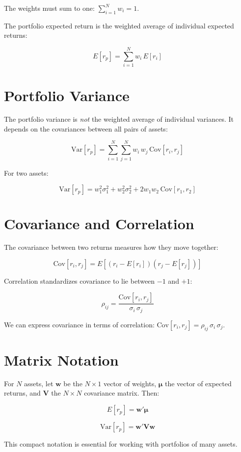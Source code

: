 \documentclass[11pt,letterpaper]{report}
\begin{document}
The weights must sum to one: $\sum_{i=1}^{N} w_i = 1$.

The portfolio expected return is the weighted average of individual expected returns:

$$E[r_p] = \sum_{i=1}^{N} w_i \, E[r_i]$$

\section{Portfolio Variance}


The portfolio variance is \textit{not} the weighted average of individual variances.  It depends on the covariances between all pairs of assets:

$$\text{Var}[r_p] = \sum_{i=1}^{N}\sum_{j=1}^{N} w_i \, w_j \, \text{Cov}[r_i, r_j]$$

For two assets:

$$\text{Var}[r_p] = w_1^2 \sigma_1^2 + w_2^2 \sigma_2^2 + 2 w_1 w_2 \, \text{Cov}[r_1, r_2]$$

\section{Covariance and Correlation}


The covariance between two returns measures how they move together:

$$\text{Cov}[r_i, r_j] = E\left[(r_i - E[r_i])(r_j - E[r_j])\right]$$

Correlation standardizes covariance to lie between $-1$ and $+1$:

$$\rho_{ij} = \frac{\text{Cov}[r_i, r_j]}{\sigma_i \, \sigma_j}$$

We can express covariance in terms of correlation: $\text{Cov}[r_i, r_j] = \rho_{ij} \, \sigma_i \, \sigma_j$.

\section{Matrix Notation}


For $N$ assets, let $\mathbf{w}$ be the $N \times 1$ vector of weights, $\boldsymbol{\mu}$ the vector of expected returns, and $\mathbf{V}$ the $N \times N$ covariance matrix.  Then:

$$E[r_p] = \mathbf{w}' \boldsymbol{\mu}$$

$$\text{Var}[r_p] = \mathbf{w}' \mathbf{V} \mathbf{w}$$

This compact notation is essential for working with portfolios of many assets.
\end{document}
